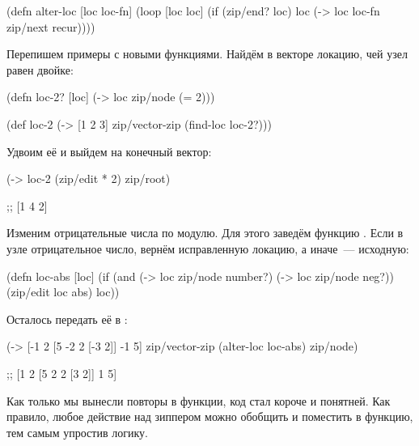 \begin{english}
  \begin{clojure}
(defn alter-loc
  [loc loc-fn]
  (loop [loc loc]
    (if (zip/end? loc)
      loc
      (-> loc loc-fn zip/next recur))))
  \end{clojure}
\end{english}

Перепишем примеры с новыми функциями. Найдём в векторе локацию, чей узел равен
двойке:

\begin{english}
  \begin{clojure}
(defn loc-2?
  [loc]
  (-> loc zip/node (= 2)))

(def loc-2
  (-> [1 2 3]
      zip/vector-zip
      (find-loc loc-2?)))
  \end{clojure}
\end{english}

Удвоим её и выйдем на конечный вектор:

\begin{english}
  \begin{clojure}
(-> loc-2 (zip/edit * 2) zip/root)

;; [1 4 2]
  \end{clojure}
\end{english}

Изменим отрицательные числа по модулю. Для этого заведём функцию . Если
в узле отрицательное число, вернём исправленную локацию, а иначе~--- исходную:

\begin{english}
  \begin{clojure}
(defn loc-abs [loc]
  (if (and (-> loc zip/node number?)
           (-> loc zip/node neg?))
    (zip/edit loc abs)
    loc))
  \end{clojure}
\end{english}

Осталось передать её в :

\begin{english}
  \begin{clojure}
(-> [-1 2 [5 -2 2 [-3 2]] -1 5]
    zip/vector-zip
    (alter-loc loc-abs)
    zip/node)

;; [1 2 [5 2 2 [3 2]] 1 5]
  \end{clojure}
\end{english}

Как только мы вынесли повторы в функции, код стал короче и понятней. Как
правило, любое действие над зиппером можно обобщить и поместить в функцию, тем
самым упростив логику.

